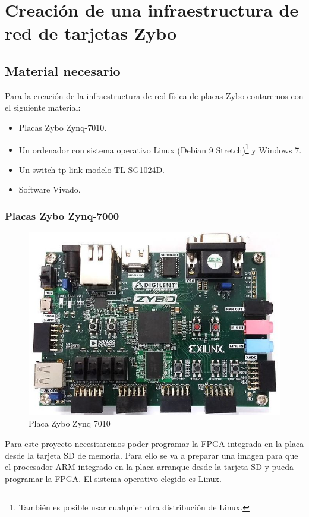 \section{Creación de una infraestructura de red de tarjetas Zybo}
\hypertarget{CreacionInfraestructura}{}
\subsection{Material necesario}
Para la creación de la infraestructura de red física de placas Zybo contaremos con el siguiente material:
\begin{itemize}
	\item Placas Zybo Zynq-7010.
	\item Un ordenador con sistema operativo Linux (Debian 9 Stretch)\footnote{También es posible usar cualquier otra distribución de Linux.} y Windows 7.
	\item Un switch tp-link modelo TL-SG1024D.
	\item Software Vivado.
\end{itemize}

\subsubsection{Placas Zybo Zynq-7000}
\begin{figure}[h]
	\centering
	\includegraphics[scale=0.5]{Anexos/Anexo2/Infraestructura/zybo.jpg}
	\caption{Placa Zybo Zynq 7010}
	\label{Placa Zybo}
\end{figure}
Para este proyecto necesitaremos poder programar la FPGA integrada en la placa desde la tarjeta SD de memoria. Para ello se va a preparar una imagen para que el procesador ARM integrado en la placa arranque desde la tarjeta SD y pueda programar la FPGA. El sistema operativo elegido es Linux.

